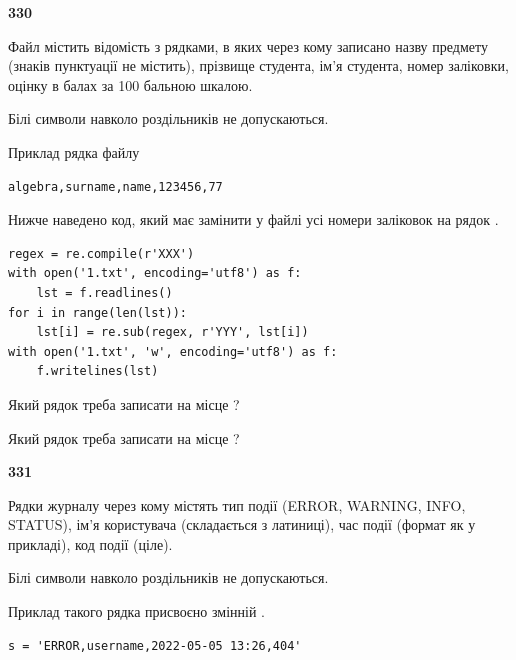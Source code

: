 \newpage

{\begin {center}\textbf{ 330}\end {center}}\par
Файл  містить відомість з рядками, в яких через кому записа\-но назву предмету (знаків пунктуації не містить), прізвище студента, ім'я студента, номер залі\-ков\-ки, оцінку в балах за 100 бальною шкалою.

Білі символи навколо роздільників не допускаються.

Приклад рядка файлу



\begin{verbatim}
algebra,surname,name,123456,77
\end{verbatim}


Нижче наведено код, який має замінити у файлі усі номери заліковок на рядок \code{***}.



\begin{verbatim}
regex = re.compile(r'XXX')
with open('1.txt', encoding='utf8') as f:
    lst = f.readlines()
for i in range(len(lst)):
    lst[i] = re.sub(regex, r'YYY', lst[i])
with open('1.txt', 'w', encoding='utf8') as f:
    f.writelines(lst)
\end{verbatim}







Який рядок треба записати на місце  ?\par
\vspace{5mm}


Який рядок треба записати на місце  ?\par


\newpage

{\begin {center}\textbf{ 331}\end {center}}\par
Рядки журналу через кому містять тип події (ERROR, WARNING, INFO, STATUS), ім'я користувача (складається з латиниці), час події (фор\-мат як у прикладі), код події (ціле).

Білі символи навколо роздільників не допускаються.

Приклад такого рядка присвоєно змінній .



\begin{verbatim}
s = 'ERROR,username,2022-05-05 13:26,404'
\end{verbatim}


